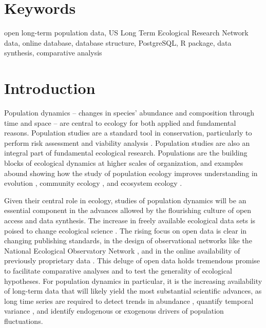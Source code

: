 \documentclass{article}\usepackage[]{graphicx}\usepackage[]{color}
\begin{document}
\section*{Keywords}
\linenumbers
open long-term population data, US Long Term Ecological Research Network data, online database, database structure, PostgreSQL, R package, data synthesis, comparative analysis

\newpage
\section*{Introduction}
\linenumbers

Population dynamics – changes in species’ abundance and composition through time and space – are central to ecology for both applied and fundamental reasons. Population studies are a standard tool in conservation, particularly to perform risk assessment and viability analysis \citep{Morris2002b,Beissinger2002}. Population studies are also an integral part of fundamental ecological research. Populations are the building blocks of ecological dynamics at higher scales of organization, and examples abound showing how the study of population ecology improves understanding in evolution \citep{Metcalf2007}, community ecology \citep{Levine2009}, and ecosystem ecology \citep{Medvigy2009,Fisher2018}.

Given their central role in ecology, studies of population dynamics will be an essential component in the advances allowed by the flourishing culture of open access and data synthesis. The increase in freely available ecological data sets is poised to change ecological science \citep{Laurance2016}. The rising focus on open data is clear in changing publishing standards, in the design of observational networks like the National Ecological Observatory Network \citep{schimel2007neon}, and in the online availability of previously proprietary data \citep{Kratz2003,Bechtold2005}. This deluge of open data holds tremendous promise to facilitate comparative analyses and to test the generality of ecological hypotheses. For population dynamics in particular, it is the increasing availability of long-term data that will likely yield the most substantial scientific advances, as long time series are required to detect trends in abundance \citep{Lindenmayer2012}, quantify temporal variance \citep{Compagnoni2016}, and identify endogenous \citep{Knape2012} or exogenous \citep{Knape2011,Hampton2013} drivers of population fluctuations.
\end{document}
